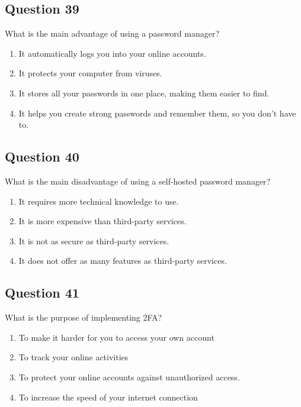 \documentclass[12pt,a4paper]{article}
\begin{document}
\bigskip


\subsection*{Question 39}
What is the main advantage of using a password manager?

\begin{enumerate}[label=\Alph*., leftmargin=*]
\item It automatically logs you into your online accounts.
\item It protects your computer from viruses.
\item It stores all your passwords in one place, making them easier to find.
\item It helps you create strong passwords and remember them, so you don't have to.
\end{enumerate}

\bigskip


\subsection*{Question 40}
What is the main disadvantage of using a self-hosted password manager?

\begin{enumerate}[label=\Alph*., leftmargin=*]
\item It requires more technical knowledge to use.
\item It is more expensive than third-party services.
\item It is not as secure as third-party services.
\item It does not offer as many features as third-party services.
\end{enumerate}

\bigskip


\subsection*{Question 41}
What is the purpose of implementing 2FA?

\begin{enumerate}[label=\Alph*., leftmargin=*]
\item To make it harder for you to access your own account
\item To track your online activities
\item To protect your online accounts against unauthorized access.
\item To increase the speed of your internet connection
\end{enumerate}
\end{document}
